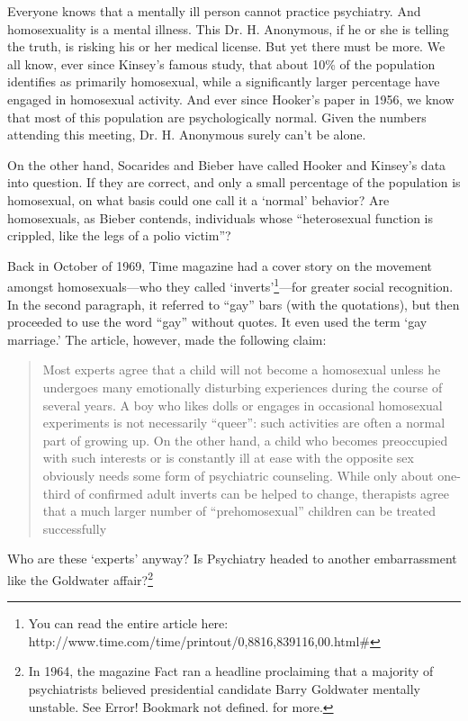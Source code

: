 Everyone knows that a mentally ill person cannot practice psychiatry. And homosexuality is a mental illness. This Dr. H. Anonymous, if he or she is telling the truth, is risking his or her medical license. But yet there must be more. We all know, ever since Kinsey's famous study, that about 10\% of the population identifies as primarily homosexual, while a significantly larger percentage have engaged in homosexual activity. And ever since Hooker's paper in 1956, we know that most of this population are psychologically normal. Given the numbers attending this meeting, Dr. H. Anonymous surely can't be alone.

On the other hand, Socarides and Bieber have called Hooker and Kinsey's data into question. If they are correct, and only a small percentage of the population is homosexual, on what basis could one call it a `normal' behavior? Are homosexuals, as Bieber contends, individuals whose ``heterosexual function is crippled, like the legs of a polio victim''? 

Back in October of 1969, Time magazine had a cover story on the movement amongst homosexuals---who they called `inverts'\footnote{You can read the entire article here: http:\slash \slash www.time.com\slash time\slash printout\slash 0,8816,839116,00.html\#}---for greater social recognition. In the second paragraph, it referred to ``gay'' bars (with the quotations), but then proceeded to use the word ``gay'' without quotes. It even used the term `gay marriage.' The article, however, made the following claim:

\begin{quote}

Most experts agree that a child will not become a homosexual unless he undergoes many emotionally disturbing experiences during the course of several years. A boy who likes dolls or engages in occasional homosexual experiments is not necessarily ``queer'': such activities are often a normal part of growing up. On the other hand, a child who becomes preoccupied with such interests or is constantly ill at ease with the opposite sex obviously needs some form of psychiatric counseling. While only about one-third of confirmed adult inverts can be helped to change, therapists agree that a much larger number of ``prehomosexual'' children can be treated successfully
\end{quote}

Who are these `experts' anyway? Is Psychiatry headed to another embarrassment like the Goldwater affair?\footnote{In 1964, the magazine Fact ran a headline proclaiming that a majority of psychiatrists believed presidential candidate Barry Goldwater mentally unstable. See Error! Bookmark not defined. for more.}

